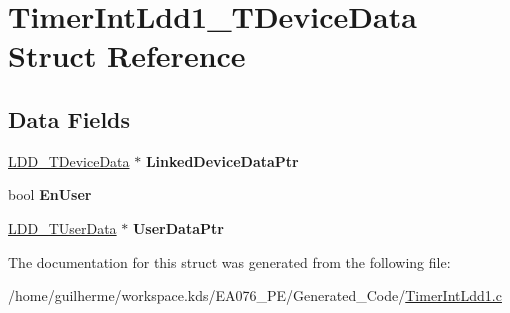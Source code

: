 \hypertarget{struct_timer_int_ldd1___t_device_data}{}\section{Timer\+Int\+Ldd1\+\_\+\+T\+Device\+Data Struct Reference}
\label{struct_timer_int_ldd1___t_device_data}
\subsection*{Data Fields}
\begin{DoxyCompactItemize}
\item 
\mbox{\label{struct_timer_int_ldd1___t_device_data_a00c04d809c08f8d1a5e0a0f5aaee94d9}} 
\hyperlink{group___p_e___types__module_gac5cf1362f1f0e3a2ce71b1bf2276d091}{L\+D\+D\+\_\+\+T\+Device\+Data} $\ast$ {\bfseries Linked\+Device\+Data\+Ptr}
\item 
\mbox{\label{struct_timer_int_ldd1___t_device_data_ad3f66f696819617171b0a89842a72e93}} 
bool {\bfseries En\+User}
\item 
\mbox{\label{struct_timer_int_ldd1___t_device_data_ac8d630b624b953cb570ae524bb618389}} 
\hyperlink{group___p_e___types__module_ga0b66a73f87238a782318aa0be7578e35}{L\+D\+D\+\_\+\+T\+User\+Data} $\ast$ {\bfseries User\+Data\+Ptr}
\end{DoxyCompactItemize}


The documentation for this struct was generated from the following file\+:\begin{DoxyCompactItemize}
\item 
/home/guilherme/workspace.\+kds/\+E\+A076\+\_\+\+P\+E/\+Generated\+\_\+\+Code/\hyperlink{_timer_int_ldd1_8c}{Timer\+Int\+Ldd1.\+c}\end{DoxyCompactItemize}
